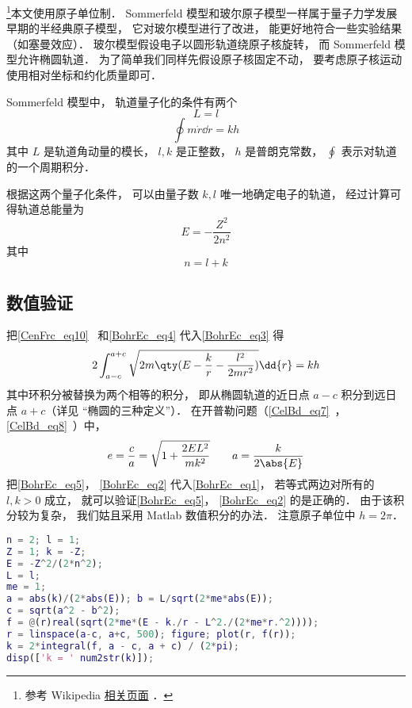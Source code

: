 
\begin{issues}
\issueDraft
\end{issues}


\footnote{参考 Wikipedia \href{https://en.wikipedia.org/wiki/Old_quantum_theory}{相关页面}
．}本文使用原子单位制． Sommerfeld 模型和玻尔原子模型一样属于量子力学发展早期的半经典原子模型， 它对玻尔模型进行了改进， 能更好地符合一些实验结果（如塞曼效应）． 玻尔模型假设电子以圆形轨道绕原子核旋转， 而 Sommerfeld 模型允许椭圆轨道． 为了简单我们同样先假设原子核固定不动， 要考虑原子核运动使用相对坐标和约化质量即可．

Sommerfeld 模型中， 轨道量子化的条件有两个
\begin{equation}\label{BohrEc_eq4}
L = l
\end{equation}
\begin{equation}\label{BohrEc_eq3}
\oint m\dot r \dd{r} = kh
\end{equation}
其中 $L$ 是轨道角动量的模长， $l, k$ 是正整数， $h$ 是普朗克常数， $\oint$ 表示对轨道的一个周期积分． 

根据这两个量子化条件， 可以由量子数 $k, l$ 唯一地确定电子的轨道， 经过计算可得轨道总能量为
\begin{equation}\label{BohrEc_eq5}
E = -\frac{Z^2}{2n^2}
\end{equation}
其中
\begin{equation}\label{BohrEc_eq2}
n = l + k
\end{equation}

\subsection{数值验证}

把\autoref{CenFrc_eq10}~ 和\autoref{BohrEc_eq4}  代入\autoref{BohrEc_eq3} 得
\begin{equation}\label{BohrEc_eq1}
2\int_{a-c}^{a+c} \sqrt{2m\qty(E - \frac{k}{r} - \frac{l^2}{2mr^2})} \dd{r} = kh
\end{equation}
其中环积分被替换为两个相等的积分， 即从椭圆轨道的近日点 $a-c$ 积分到远日点 $a+c$（详见 “椭圆的三种定义”）． 在开普勒问题（\autoref{CelBd_eq7}~，\autoref{CelBd_eq8}~）中，
\begin{equation}
e = \frac{c}{a} = \sqrt{1 + \frac{2EL^2}{mk^2}}
\qquad
a = \frac{k}{2\abs{E}}
\end{equation}
把\autoref{BohrEc_eq5}， \autoref{BohrEc_eq2} 代入\autoref{BohrEc_eq1}， 若等式两边对所有的 $l,k > 0$ 成立， 就可以验证\autoref{BohrEc_eq5}， \autoref{BohrEc_eq2} 的是正确的． 由于该积分较为复杂， 我们姑且采用 Matlab 数值积分的办法． 注意原子单位中 $h = 2\pi$．
\begin{lstlisting}[language=matlab]
n = 2; l = 1;
Z = 1; k = -Z;
E = -Z^2/(2*n^2);
L = l;
me = 1;
a = abs(k)/(2*abs(E)); b = L/sqrt(2*me*abs(E));
c = sqrt(a^2 - b^2);
f = @(r)real(sqrt(2*me*(E - k./r - L^2./(2*me*r.^2))));
r = linspace(a-c, a+c, 500); figure; plot(r, f(r));
k = 2*integral(f, a - c, a + c) / (2*pi);
disp(['k = ' num2str(k)]);
\end{lstlisting}


